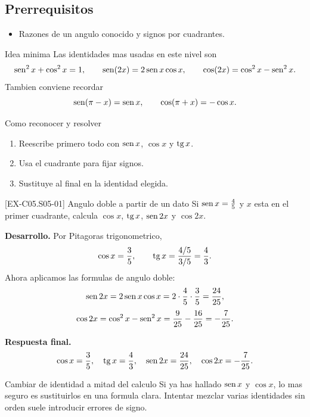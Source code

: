 \subsection*{Prerrequisitos}
\begin{itemize}
  \item Razones de un angulo conocido y signos por cuadrantes.
\end{itemize}

\begin{theorybox}{Idea minima}
Las identidades mas usadas en este nivel son
\[
\operatorname{sen}^2 x+\cos^2 x=1,
\qquad
\operatorname{sen}(2x)=2\operatorname{sen} x\cos x,
\qquad
\cos(2x)=\cos^2 x-\operatorname{sen}^2 x.
\]
Tambien conviene recordar
\[
\operatorname{sen}(\pi-x)=\operatorname{sen} x,
\qquad
\cos(\pi+x)=-\cos x.
\]
\end{theorybox}

\begin{methodbox}{Como reconocer y resolver}
\begin{enumerate}
  \item Reescribe primero todo con \(\operatorname{sen} x\), \(\cos x\) y \(\operatorname{tg} x\).
  \item Usa el cuadrante para fijar signos.
  \item Sustituye al final en la identidad elegida.
\end{enumerate}
\end{methodbox}

\begin{solvedexample}{[EX-C05.S05-01] Angulo doble a partir de un dato}
Si \(\operatorname{sen} x=\frac{4}{5}\) y \(x\) esta en el primer cuadrante, calcula \(\cos x\), \(\operatorname{tg} x\),
\(\operatorname{sen} 2x\) y \(\cos 2x\).

\textbf{Desarrollo.} Por Pitagoras trigonometrico,
\[
\cos x=\frac{3}{5},
\qquad
\operatorname{tg} x=\frac{4/5}{3/5}=\frac{4}{3}.
\]
Ahora aplicamos las formulas de angulo doble:
\[
\operatorname{sen} 2x=2\operatorname{sen} x\cos x=2\cdot \frac{4}{5}\cdot \frac{3}{5}=\frac{24}{25},
\]
\[
\cos 2x=\cos^2 x-\operatorname{sen}^2 x=\frac{9}{25}-\frac{16}{25}=-\frac{7}{25}.
\]

\textbf{Respuesta final.}
\[
\cos x=\frac{3}{5},
\quad
\operatorname{tg} x=\frac{4}{3},
\quad
\operatorname{sen} 2x=\frac{24}{25},
\quad
\cos 2x=-\frac{7}{25}.
\]
\end{solvedexample}

\begin{commonerror}{Cambiar de identidad a mitad del calculo}
Si ya has hallado \(\operatorname{sen} x\) y \(\cos x\), lo mas seguro es sustituirlos en una formula clara.
Intentar mezclar varias identidades sin orden suele introducir errores de signo.
\end{commonerror}

